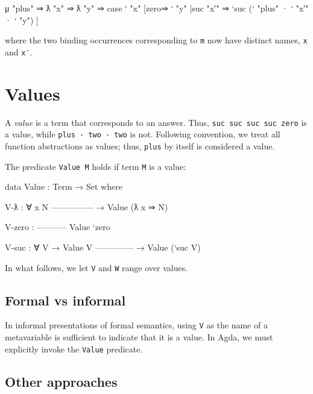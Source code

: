 \begin{myDisplay}
μ "plus" ⇒ ƛ "x" ⇒ ƛ "y" ⇒
  case ` "x"
    [zero⇒ ` "y"
    |suc "x′" ⇒ `suc (` "plus" · ` "x′" · ` "y") ]
\end{myDisplay}

where the two binding occurrences corresponding to \texttt{m} now have
distinct names, \texttt{x} and \texttt{x′}.

\hypertarget{values}{%
\section{Values}\label{values}}

A \emph{value} is a term that corresponds to an answer. Thus,
\texttt{\textasciigrave{}suc\ \textasciigrave{}suc\ \textasciigrave{}suc\ \textasciigrave{}suc\ \textasciigrave{}zero}
is a value, while \texttt{plus\ ·\ two\ ·\ two} is not. Following
convention, we treat all function abstractions as values; thus,
\texttt{plus} by itself is considered a value.

The predicate \texttt{Value\ M} holds if term \texttt{M} is a value:

\begin{fence}
\begin{code}
data Value : Term → Set where

  V-ƛ : ∀ {x N}
      ---------------
    → Value (ƛ x ⇒ N)

  V-zero :
      -----------
      Value `zero

  V-suc : ∀ {V}
    → Value V
      --------------
    → Value (`suc V)
\end{code}
\end{fence}

In what follows, we let \texttt{V} and \texttt{W} range over values.

\hypertarget{formal-vs-informal-1}{%
\subsection{Formal vs informal}\label{formal-vs-informal-1}}

In informal presentations of formal semantics, using \texttt{V} as the
name of a metavariable is sufficient to indicate that it is a value. In
Agda, we must explicitly invoke the \texttt{Value} predicate.

\hypertarget{other-approaches}{%
\subsection{Other approaches}\label{other-approaches}}

